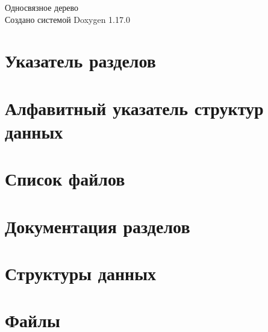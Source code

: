 \documentclass[twoside]{book}
\newcommand{\+}{\discretionary{\mbox{\scriptsize$\hookleftarrow$}}{}{}}
\newcommand{\clearemptydoublepage}{%
    \newpage{\pagestyle{empty}\cleardoublepage}%
  }
\begin{document}
  \raggedbottom
    \hypersetup{pageanchor=false,
                bookmarksnumbered=true,
                pdfencoding=unicode
               }
  \begin{titlepage}
  \vspace*{7cm}
  \begin{center}%
  {\Large Односвязное дерево}\\
  \vspace*{1cm}
  {\large Создано системой Doxygen 1.17.0}\\
  \end{center}
  \end{titlepage}
  \clearemptydoublepage
  \tableofcontents
  \clearemptydoublepage
  \hypersetup{pageanchor=true}

\chapter{Указатель разделов}

\chapter{Алфавитный указатель структур данных}

\chapter{Список файлов}

\chapter{Документация разделов}

\chapter{Структуры данных}


\chapter{Файлы}


  \backmatter
  \newpage
  \clearemptydoublepage
  \printindex
\end{document}
